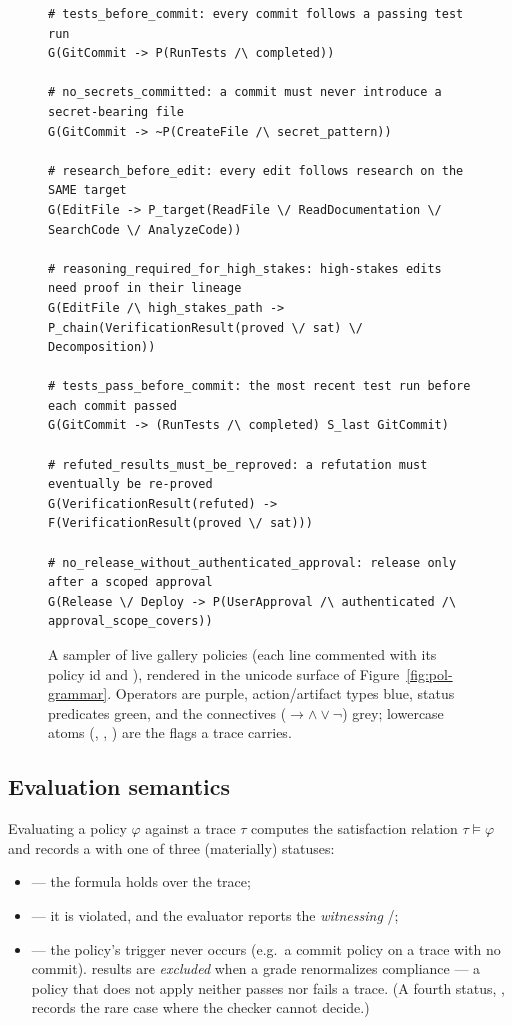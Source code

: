 \begin{figure}[H]
\begin{lstlisting}[language=Policy]
# tests_before_commit: every commit follows a passing test run
G(GitCommit -> P(RunTests /\ completed))

# no_secrets_committed: a commit must never introduce a secret-bearing file
G(GitCommit -> ~P(CreateFile /\ secret_pattern))

# research_before_edit: every edit follows research on the SAME target
G(EditFile -> P_target(ReadFile \/ ReadDocumentation \/ SearchCode \/ AnalyzeCode))

# reasoning_required_for_high_stakes: high-stakes edits need proof in their lineage
G(EditFile /\ high_stakes_path -> P_chain(VerificationResult(proved \/ sat) \/ Decomposition))

# tests_pass_before_commit: the most recent test run before each commit passed
G(GitCommit -> (RunTests /\ completed) S_last GitCommit)

# refuted_results_must_be_reproved: a refutation must eventually be re-proved
G(VerificationResult(refuted) -> F(VerificationResult(proved \/ sat)))

# no_release_without_authenticated_approval: release only after a scoped approval
G(Release \/ Deploy -> P(UserApproval /\ authenticated /\ approval_scope_covers))
\end{lstlisting}
\caption{A sampler of live gallery policies (each line commented with its policy id
and ), rendered in the unicode surface of
Figure~\ref{fig:pol-grammar}. Operators are purple, action/artifact types blue,
status predicates green, and the connectives ($\rightarrow \land \lor \lnot$)
grey; lowercase atoms (, ,
) are the flags a trace carries.}
\label{fig:pol-gallery}
\end{figure}

\subsection{Evaluation semantics}\label{sec:pol-eval}

Evaluating a policy \(\varphi\) against a trace \(\tau\) computes the satisfaction
relation \(\tau \models \varphi\) and records a  with one
of three (materially) statuses:
\begin{itemize}
\item {} --- the formula holds over the trace;
\item {} --- it is violated, and the evaluator reports the
\emph{witnessing} \slash\allowbreak{};
\item {} --- the policy's trigger never occurs (e.g.\ a commit
policy on a trace with no commit).  results are \emph{excluded}
when a grade renormalizes compliance --- a policy that does not apply neither
passes nor fails a trace. (A fourth status, , records the
rare case where the checker cannot decide.)
\end{itemize}

